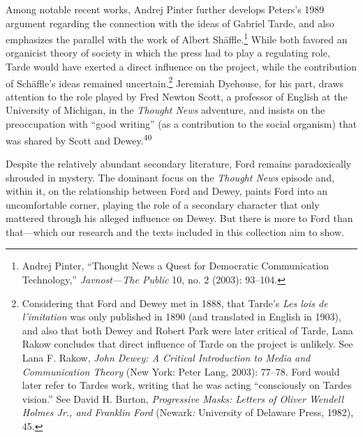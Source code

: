 \documentclass[openany,nobib]{tufte-book}
\begin{document}
\enlargethispage{\baselineskip}

Among notable recent works, Andrej Pinter further develops Peters's 1989
argument regarding the connection with the ideas of Gabriel Tarde, and
also emphasizes the parallel with the work of Albert Shäffle.\footnote{Andrej
  Pinter, ``Thought News a Quest for Democratic Communication
  Technology,'' \emph{Javnost---The Public} 10, no. 2 (2003): 93--104.}
While both favored an organicist theory of society in which the press
had to play a regulating role, Tarde would have exerted a direct
influence on the project, while the contribution of Schäffle's ideas
remained uncertain.\footnote{Considering that Ford and Dewey met in
  1888, that Tarde's \emph{Les lois de l'imitation} was only published
  in 1890 (and translated in English in 1903), and also that both Dewey
  and Robert Park were later critical of Tarde, Lana Rakow concludes
  that direct influence of Tarde on the project is unlikely. See Lana F.
  Rakow, \emph{John Dewey: A Critical Introduction to Media and
  Communication Theory} (New York: Peter Lang, 2003): 77--78. Ford would
  later refer to Tarde\textquotesingle s work, writing that he was
  acting ``consciously on Tarde\textquotesingle s vision.'' See David H.
  Burton, \emph{Progressive Masks: Letters of Oliver Wendell Holmes Jr.,
  and Franklin Ford} (Newark\emph{:} University of Delaware Press,
  1982), 45.} Jeremiah Dyehouse, for his part, draws attention to the
role played by Fred Newton Scott, a professor of English at the
University of Michigan, in the \emph{Thought News} adventure, and
insists on the preoccupation with ``good writing'' (as a contribution to
the social organism) that was shared by Scott and Dewey.\textsuperscript{40}

Despite the relatively abundant secondary literature, Ford remains
paradoxically shrouded in mystery. The dominant focus on the
\emph{Thought News} episode and, within it, on the relationship between
Ford and Dewey, paints Ford into an uncomfortable corner, playing the
role of a secondary character that only mattered through his alleged
influence on Dewey. But there is more to Ford than that---which our
research and the texts included in this collection aim to show.
\end{document}
